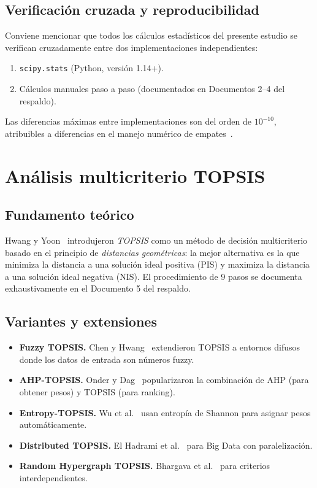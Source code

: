 \documentclass[12pt,a4paper,oneside]{book}
\begin{document}
\subsection{Verificación cruzada y reproducibilidad}

Conviene mencionar que todos los cálculos estadísticos del presente estudio se verifican cruzadamente entre dos implementaciones independientes:
\begin{enumerate}
    \item \texttt{scipy.stats} (Python, versión 1.14+).
    \item Cálculos manuales paso a paso (documentados en Documentos 2--4 del respaldo).
\end{enumerate}
Las diferencias máximas entre implementaciones son del orden de $10^{-10}$, atribuibles a diferencias en el manejo numérico de empates~\cite{VirtanenScipy2020}.

\newpage
\section{Análisis multicriterio TOPSIS}
\label{doc7:sec:topsis}

\subsection{Fundamento teórico}

Hwang y Yoon~\cite{HwangYoon1981} introdujeron \emph{TOPSIS} como un método de decisión multicriterio basado en el principio de \emph{distancias geométricas}: la mejor alternativa es la que minimiza la distancia a una solución ideal positiva (PIS) y maximiza la distancia a una solución ideal negativa (NIS). El procedimiento de 9 pasos se documenta exhaustivamente en el Documento 5 del respaldo.

\subsection{Variantes y extensiones}

\begin{itemize}
    \item \textbf{Fuzzy TOPSIS.} Chen y Hwang~\cite{ChenHwang1992} extendieron TOPSIS a entornos difusos donde los datos de entrada son números fuzzy.
    \item \textbf{AHP-TOPSIS.} Onder y Dag~\cite{Onder2013} popularizaron la combinación de AHP (para obtener pesos) y TOPSIS (para ranking).
    \item \textbf{Entropy-TOPSIS.} Wu et al.~\cite{Wu2020} usan entropía de Shannon para asignar pesos automáticamente.
    \item \textbf{Distributed TOPSIS.} El Hadrami et al.~\cite{ElHadrami2023} para Big Data con paralelización.
    \item \textbf{Random Hypergraph TOPSIS.} Bhargava et al.~\cite{Bhargava2024} para criterios interdependientes.
\end{itemize}
\end{document}
